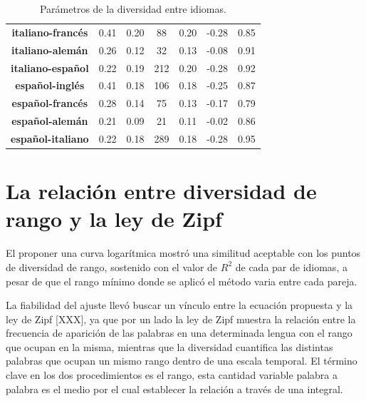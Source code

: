 \begin{table}[h!]
\begin{tabular}{ccccccc}
		\textbf{italiano-francés} & 0.41           & 0.20                & 88                    & 0.20           & -0.28         & 0.85        \\
		\textbf{italiano-alemán}  & 0.26           & 0.12                & 32                    & 0.13           & -0.08         & 0.91        \\
		\textbf{italiano-español}  & 0.22          & 0.19                & 212                    & 0.20           & -0.28         & 0.92       \\
		\textbf{español-inglés}  & 0.41          & 0.18                & 106                   & 0.18           & -0.25        & 0.87        \\
		\textbf{español-francés}   & 0.28           & 0.14                & 75                   & 0.13           & -0.17         & 0.79        \\
		\textbf{español-alemán} & 0.21           & 0.09                & 21                    & 0.11           & -0.02         & 0.86        \\
		\textbf{español-italiano}  & 0.22          & 0.18                & 289                    & 0.18           & -0.28         & 0.95       
	\end{tabular}
	\caption{Parámetros de la diversidad entre idiomas.}
	\label{tab.DR_EN}
\end{table}


\clearpage
\section{La relación entre diversidad de rango y la ley de Zipf}

El proponer una curva logarítmica mostró una similitud aceptable con los puntos de diversidad de rango, sostenido con el valor de $R^{2}$ de cada par de idiomas, a pesar de que el rango mínimo donde se aplicó el método varia entre cada pareja. 

La fiabilidad del ajuste llevó buscar un vínculo entre la ecuación propuesta y  la ley de Zipf [XXX], ya que por un lado la ley de Zipf muestra la relación entre la frecuencia de aparición de las palabras en una determinada lengua con el rango que ocupan en la misma,  mientras que la diversidad cuantifica las distintas palabras que ocupan un mismo rango dentro de una escala temporal.  El término clave en los dos procedimientos es el rango, esta cantidad variable palabra a palabra es el medio por el cual establecer la relación a través de una integral.

